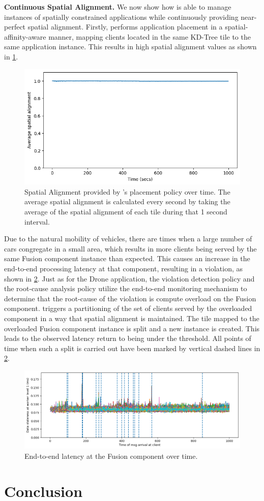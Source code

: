 \par \noindent \textbf{Continuous Spatial Alignment. } We now show how \oneedge{} is able to manage instances of spatially constrained applications while continuously providing near-perfect spatial alignment. Firstly, \oneedge{} performs application placement in a spatial-affinity-aware manner, mapping clients located in the same KD-Tree tile to the same application instance. This results in high spatial alignment values as shown in \cref{fig:mapfusion_spatial_alignment}.
\begin{figure}[ht]
  \centering
    \includegraphics[width=0.8\columnwidth]{figures/oneedge/spatial_alignment_vs_time.png}
    \caption{Spatial Alignment provided by \oneedge{}'s placement policy over time. The average spatial alignment is calculated every second by taking the average of the spatial alignment of each tile during that 1 second interval.}
    \label{fig:mapfusion_spatial_alignment}
\end{figure}
Due to the natural mobility of vehicles, there are times when a large number of cars congregate in a small area, which results in more clients being served by the same Fusion component instance than expected. This causes an increase in the end-to-end processing latency at that component, resulting in a violation, as shown in \cref{fig:mapfusion_latency}. Just as for the Drone application, the violation detection policy and the root-cause analysis policy utilize the end-to-end monitoring mechanism to determine that the root-cause of the violation is compute overload on the Fusion component. \oneedge{} triggers a partitioning of the set of clients served by the overloaded component in a way that spatial alignment is maintained. The tile mapped to the overloaded Fusion component instance is split and a new instance is created. This leads to the observed latency return to being under the threshold. All points of time when such a split is carried out have been marked by vertical dashed lines in \cref{fig:mapfusion_latency}.
\begin{figure}[ht]
  \centering
    \includegraphics[width=0.8\columnwidth]{figures/oneedge/mapfusion_latencies.png}
    \caption{End-to-end latency at the Fusion component over time.}
    \label{fig:mapfusion_latency}
\end{figure}

\section{Conclusion}
\label{sec:oneedge_conclusion}